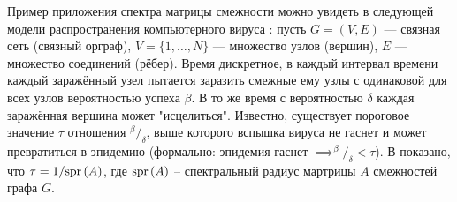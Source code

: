 Пример приложения спектра матрицы смежности можно увидеть
в следующей модели распространения компьютерного вируса \cite{epidemic-eigenvalues}:
пусть \( G = (V, E) \) --- связная сеть (связный орграф),
\( V = \{1, \ldots, N\} \) --- множество узлов (вершин),
\( E \) --- множество соединений (рёбер).
Время дискретное, в каждый интервал времени каждый заражённый узел
пытается заразить смежные ему узлы с одинаковой для всех узлов вероятностью успеха \( \beta \).
В то же время с вероятностью \( \delta \) каждая заражённая вершина может "исцелиться".
Известно, существует пороговое значение \( \tau \) отношения \( {^\beta}/_{\delta} \),
выше которого вспышка вируса не гаснет и может превратиться в эпидемию
(формально: эпидемия гаснет \( \implies ^{\beta}/_{\delta} < \tau \)).
В \cite{epidemic-eigenvalues} показано, что \( \tau = 1/\mathrm{spr}\left({A}\right) \),
где \( \mathrm{spr}\left({A}\right) \) -- спектральный радиус мартрицы \( A \) смежностей графа \( G \).
